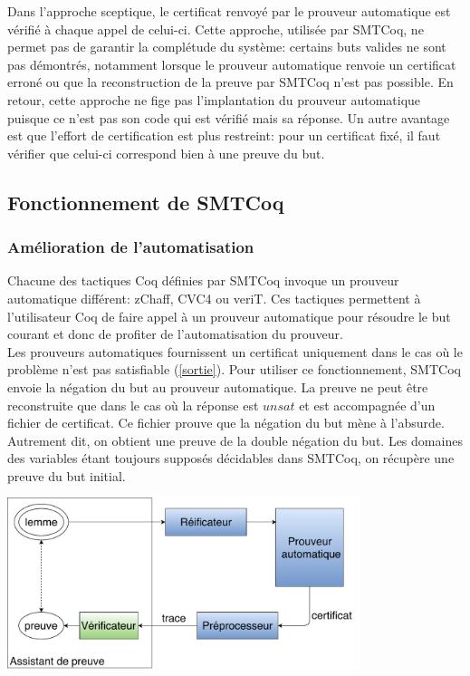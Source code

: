 \documentclass[11pt]{article}
\begin{document}
Dans l'approche sceptique, le certificat renvoyé par le prouveur automatique est vérifié à chaque appel de celui-ci. Cette approche, utilisée par SMTCoq, ne permet pas de garantir la complétude du système: certains buts valides ne sont pas démontrés, notamment lorsque le prouveur automatique renvoie un certificat erroné ou que la reconstruction de la preuve par SMTCoq n'est pas possible. En retour, cette approche ne fige pas l'implantation du prouveur automatique puisque ce n'est pas son code qui est vérifié mais sa réponse. Un autre avantage est que l'effort de certification est plus restreint: pour un certificat fixé, il faut vérifier que celui-ci correspond bien à une preuve du but.

\subsection{Fonctionnement de SMTCoq}

\subsubsection{Amélioration de l'automatisation}\label{negation}

Chacune des tactiques Coq définies par SMTCoq invoque un prouveur automatique différent: zChaff, CVC4 ou veriT. Ces tactiques permettent à l'utilisateur Coq de faire appel à un prouveur automatique pour résoudre le but courant et donc de profiter de l'automatisation du prouveur. \\

Les prouveurs automatiques fournissent un certificat uniquement dans le cas où le problème n'est pas satisfiable (\ref{sortie}). Pour utiliser ce fonctionnement, SMTCoq envoie la négation du but au prouveur automatique. La preuve ne peut être reconstruite que dans le cas où la réponse est $unsat$ et est accompagnée d'un fichier de certificat. Ce fichier prouve que la négation du but mène à l'absurde. Autrement dit, on obtient une preuve de la double négation du but. Les domaines des variables étant toujours supposés décidables dans SMTCoq, on récupère une preuve du but initial.

\begin{center}
    \includegraphics[height=5cm]{Automatisation.pdf}
\end{center}
\end{document}
